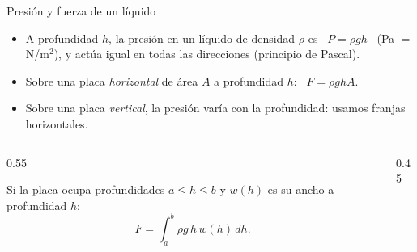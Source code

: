 \documentclass[10pt,aspectratio=169]{beamer}
\begin{document}
\begin{frame}{Presión y fuerza de un líquido}
  \begin{itemize}
    \item A profundidad $h$, la presión en un líquido de densidad $\rho$ es \ $P=\rho g h$ \ (Pa $=$ N/m$^2$),
      y actúa igual en todas las direcciones (principio de Pascal).
    \item Sobre una placa \emph{horizontal} de área $A$ a profundidad $h$: \ $F=\rho g h A$.
    \item Sobre una placa \emph{vertical}, la presión varía con la profundidad: usamos franjas horizontales.
  \end{itemize}
  \begin{columns}
    \begin{column}{0.55\textwidth}
      \begin{teorema}
        Si la placa ocupa profundidades $a\le h\le b$ y $w(h)$ es su ancho a profundidad $h$:
        \[ F=\int_a^b\rho g\,h\,w(h)\,dh. \]
      \end{teorema}
    \end{column}
    \begin{column}{0.45\textwidth}
      \centering
    \end{column}
  \end{columns}
\end{frame}
\end{document}

